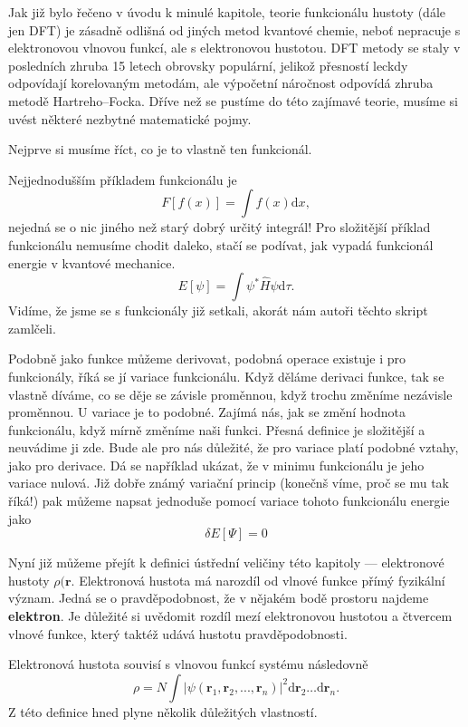 Jak již bylo řečeno v úvodu k minulé kapitole, teorie funkcionálu hustoty (dále jen DFT) je zásadně odlišná od jiných metod kvantové chemie, neboť nepracuje s elektronovou vlnovou funkcí, ale s elektronovou hustotou. DFT metody se staly v posledních zhruba 15 letech obrovsky populární, jelikož přesností leckdy odpovídají korelovaným metodám, ale výpočetní náročnost odpovídá zhruba metodě Hartreho--Focka. Dříve než se pustíme do této zajímavé teorie, musíme si uvést některé nezbytné matematické pojmy. 

Nejprve si musíme říct, co je to vlastně ten funkcionál.

Nejjednodušším příkladem funkcionálu je
$$
F[f(x)] = \int f(x) \mathrm{d}x, 
$$
nejedná se o nic jiného než starý dobrý určitý integrál! 
Pro složitější příklad funkcionálu nemusíme chodit daleko, stačí se podívat, jak vypadá funkcionál energie v kvantové mechanice.
$$
E[\psi] = \int \psi^*\hat{H}\psi \mathrm{d}\tau .
$$
Vidíme, že jsme se s funkcionály již setkali, akorát nám autoři těchto skript zamlčeli.

Podobně jako funkce můžeme derivovat, podobná operace existuje i pro funkcionály, říká se jí variace funkcionálu.
Když děláme derivaci funkce, tak se vlastně díváme, co se děje se závisle proměnnou, když trochu změníme nezávisle proměnnou.
U variace je to podobné. Zajímá nás, jak se změní hodnota funkcionálu, když mírně změníme naši funkci. Přesná definice je složitější a neuvádime ji zde. Bude ale pro nás důležité, že pro variace platí podobné vztahy, jako pro derivace. Dá se například ukázat, že v minimu funkcionálu je jeho variace nulová. Již dobře známý variační princip (konečnš víme, proč se mu tak říká!) pak můžeme napsat jednoduše pomocí variace tohoto funkcionálu energie jako
$$
\delta E[\Psi] = 0
$$

Nyní již můžeme přejít k definici ústřední veličiny této kapitoly --- elektronové hustoty $\rho(\mathbf{r}$.
Elektronová hustota má narozdíl od vlnové funkce přímý fyzikální význam. Jedná se o pravděpodobnost, že v nějakém bodě prostoru najdeme \textbf{elektron}. Je důležité si uvědomit rozdíl mezí elektronovou hustotou a čtvercem vlnové funkce, který taktéž udává hustotu pravděpodobnosti. 

Elektronová hustota souvisí s vlnovou funkcí systému následovně
\begin{equation}
\rho=N \int |\psi(\textbf{r}_1,\textbf{r}_2,...,\textbf{r}_n)|^2 \mathrm{d}\textbf{r}_2\dots\mathrm{d}\textbf{r}_n .
\end{equation}
Z této definice hned plyne několik důležitých vlastností.

